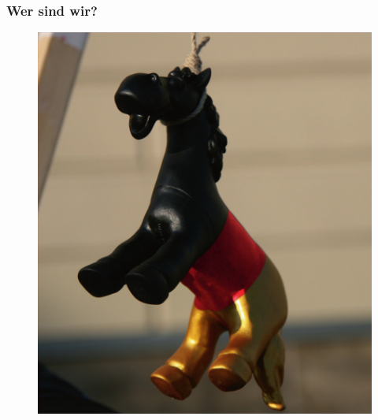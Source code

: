 \documentclass[12pt]{beamer}
\begin{document}
\begin{frame}
  \frametitle{Wer sind wir?}
  \begin{figure}
    \includegraphics[height=0.7\textheight]{img/trojaner.jpg}
  \end{figure}
\end{frame}
\end{document}
